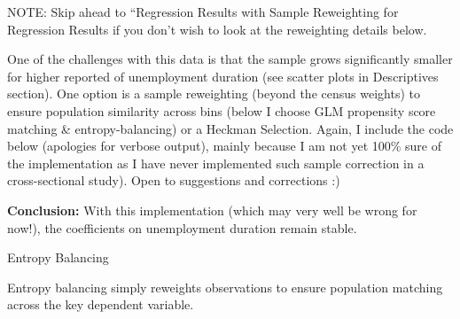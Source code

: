 \documentclass[
]{article}
\newenvironment{Shaded}{\begin{snugshade}}{\end{snugshade}}
\newcommand{\AttributeTok}[1]{\textcolor[rgb]{0.13,0.29,0.53}{#1}}
\newcommand{\CommentTok}[1]{\textcolor[rgb]{0.56,0.35,0.01}{\textit{#1}}}
\newcommand{\DecValTok}[1]{\textcolor[rgb]{0.00,0.00,0.81}{#1}}
\newcommand{\FunctionTok}[1]{\textcolor[rgb]{0.13,0.29,0.53}{\textbf{#1}}}
\newcommand{\NormalTok}[1]{#1}
\newcommand{\OtherTok}[1]{\textcolor[rgb]{0.56,0.35,0.01}{#1}}
\newcommand{\SpecialCharTok}[1]{\textcolor[rgb]{0.81,0.36,0.00}{\textbf{#1}}}
\newcommand{\StringTok}[1]{\textcolor[rgb]{0.31,0.60,0.02}{#1}}
\begin{document}
NOTE: Skip ahead to ``Regression Results with Sample Reweighting for
Regression Results if you don't wish to look at the reweighting details
below.

One of the challenges with this data is that the sample grows
significantly smaller for higher reported of unemployment duration (see
scatter plots in Descriptives section). One option is a sample
reweighting (beyond the census weights) to ensure population similarity
across bins (below I choose GLM propensity score matching \&
entropy-balancing) or a Heckman Selection. Again, I include the code
below (apologies for verbose output), mainly because I am not yet 100\%
sure of the implementation as I have never implemented such sample
correction in a cross-sectional study). Open to suggestions and
corrections :)

\textbf{Conclusion:} With this implementation (which may very well be
wrong for now!), the coefficients on unemployment duration remain
stable.

Entropy Balancing

Entropy balancing simply reweights observations to ensure population
matching across the key dependent variable.

\begin{Shaded}
\end{Shaded}
\end{document}
